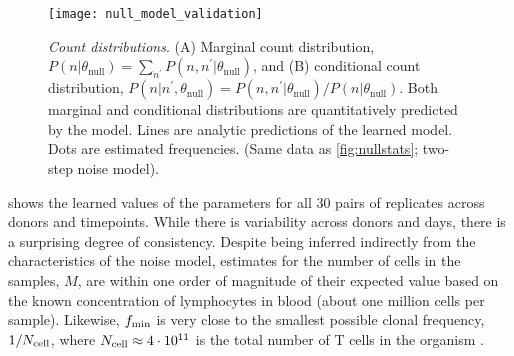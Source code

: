 
\begin{figure}
\texttt{[image: null\_model\_validation]}
\centering{}
\caption{
  \emph{Count distributions}. (A) Marginal count distribution, $P(n|\theta_{\textrm{null}})=\sum_{n^{\prime}}P(n,n^{\prime}|\theta_{\textrm{null}})$, and (B) conditional count distribution, $P(n|n^{\prime},\theta_{\textrm{null}})=P(n,n^{\prime}|\theta_{\textrm{null}})/P(n|\theta_{\textrm{null}})$. Both marginal and conditional distributions are quantitatively predicted by the model. Lines are analytic predictions of the learned model. Dots are estimated frequencies. (Same data as \cref{fig:nullstats}; two-step noise model).
\label{fig:modelfit}}
\end{figure}

 shows the learned values of the parameters for all 30 pairs of replicates across donors and timepoints.
While there is variability across donors and days, there is a surprising degree of consistency. Despite being inferred indirectly from the characteristics of the noise model, estimates for the number of cells in the samples, $M$, are within one order of magnitude of their expected value based on the known concentration of lymphocytes in blood (about one million cells per sample). Likewise, $f_{\rm min}$ is very close to the smallest possible clonal frequency, $1/N_{\rm cell}$, where $N_{\rm cell}\approx 4\cdot 10^{11}$  is the total number of T cells in the organism \cite{Jenkins2010}.

